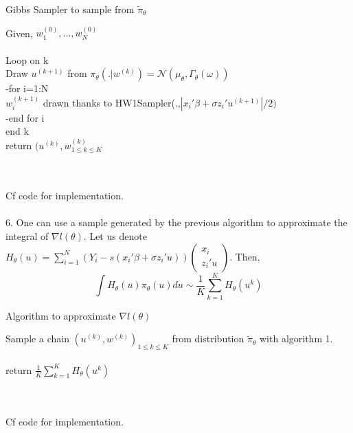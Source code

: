 \begin{algorithm}
	\caption{Gibbs Sampler to sample from $\tilde{\pi}_{\theta}$}\label{RS}
	Given, $w_{1}^{(0)}, ..., w_{N}^{(0)}$~\\
	~\\
	Loop on k~\\
	Draw $u^{(k+1)}$ from $\pi_{\theta}(. | w^{(k)}) = \mathcal{N}(\mu_{\theta},\Gamma_{\theta}(\omega))$~\\
	-for i=1:N~\\
	$w_{i}^{(k+1)}$ drawn thanks to HW1Sampler(.,$|x_i'\beta + \sigma z_i' u^{(k+1)}|/2)$\\
	-end for i~\\
	end k~\\
	return $(u^{(k)},w^{(k)}_{1\leq k \leq K}$
\end{algorithm}~\\
~\\
Cf code for implementation.~\\
~\\
6. One can use a sample generated by the previous algorithm to approximate the integral of $\nabla l(\theta)$.
Let us denote $H_{\theta}(u)=\sum_{i=1}^{N}(Y_i-s(x_i'\beta+\sigma z_i'u)) \left(
\begin{smallmatrix}
x_i\\ z_i'u
\end{smallmatrix}
\right)$. Then, 
$$\int H_{\theta}(u)\pi_{\theta}(u)du   \sim \frac{1}{K}\sum_{k=1}^{K} H_{\theta}(u^k) $$
\begin{algorithm}
	\caption{Algorithm to approximate $ \nabla l(\theta)$}\label{RS}
	Sample a chain $(u^{(k)},w^{(k)})_{1\leq k \leq K}$ from distribution $\tilde{\pi}_{\theta}$ with algorithm 1.~\\
	~\\
	return $\frac{1}{K}\sum_{k=1}^{K} H_{\theta}(u^k)$
\end{algorithm}~\\
~\\	
Cf code for implementation.